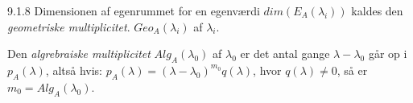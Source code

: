 \begin{notation}{9.1.8}
	Dimensionen af egenrummet for en egenværdi $dim(E_A(\lambda_i))$ kaldes den
	\textit{geometriske multiplicitet}. $Geo_A(\lambda_i)$ af $\lambda_i$.

	Den \textit{algrebraiske multiplicitet} $Alg_A(\lambda_0)$ af $\lambda_0$ er
	det antal gange $\lambda-\lambda_0$ går op i $p_A(\lambda)$, altså hvis:
	$p_A(\lambda) = (\lambda-\lambda_0)^{m_0}q(\lambda)$, hvor $q(\lambda) 
	\not= 0$, så er $m_0 = Alg_A(\lambda_0)$.
\end{notation}
